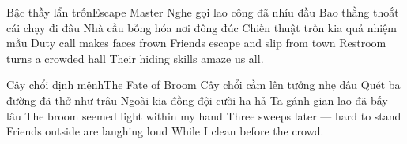 \begin{tutuyetbox}{Bậc thầy lẩn trốn}{Escape Master}
Nghe gọi lao công đã nhíu đầu
Bao thằng thoắt cái chạy đi đâu
Nhà cầu bỗng hóa nơi đông đúc
Chiến thuật trốn kia quả nhiệm mầu
\tcblower
Duty call makes faces frown
Friends escape and slip from town
Restroom turns a crowded hall
Their hiding skills amaze us all.
\end{tutuyetbox}

\begin{tutuyetbox}{Cây chổi định mệnh}{The Fate of Broom}
Cây chổi cầm lên tưởng nhẹ đâu
Quét ba đường đã thở như trâu
Ngoài kia đồng đội cười ha hả
Ta gánh gian lao đã bấy lâu
\tcblower
The broom seemed light within my hand
Three sweeps later — hard to stand
Friends outside are laughing loud
While I clean before the crowd.
\end{tutuyetbox}